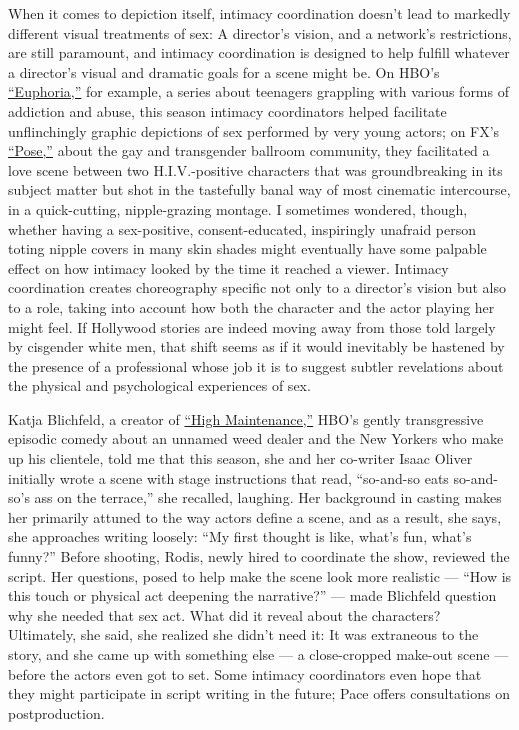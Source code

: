 When it comes to depiction itself, intimacy coordination doesn't lead to
markedly different visual treatments of sex: A director's vision, and a
network's restrictions, are still paramount, and intimacy coordination
is designed to help fulfill whatever a director's visual and dramatic
goals for a scene might be. On HBO's
\href{https://www.nytimes3xbfgragh.onion/2019/06/14/arts/television/euphoria-review-hbo.html}{``Euphoria,''}
for example, a series about teenagers grappling with various forms of
addiction and abuse, this season intimacy coordinators helped facilitate
unflinchingly graphic depictions of sex performed by very young actors;
on FX's
\href{https://www.nytimes3xbfgragh.onion/2018/06/01/arts/television/pose-review-fx-ryan-murphy.html}{``Pose,''}
about the gay and transgender ballroom community, they facilitated a
love scene between two H.I.V.-positive characters that was
groundbreaking in its subject matter but shot in the tastefully banal
way of most cinematic intercourse, in a quick-cutting, nipple-grazing
montage. I sometimes wondered, though, whether having a sex-positive,
consent-educated, inspiringly unafraid person toting nipple covers in
many skin shades might eventually have some palpable effect on how
intimacy looked by the time it reached a viewer. Intimacy coordination
creates choreography specific not only to a director's vision but also
to a role, taking into account how both the character and the actor
playing her might feel. If Hollywood stories are indeed moving away from
those told largely by cisgender white men, that shift seems as if it
would inevitably be hastened by the presence of a professional whose job
it is to suggest subtler revelations about the physical and
psychological experiences of sex.

Katja Blichfeld, a creator of
\href{https://www.nytimes3xbfgragh.onion/2016/09/16/arts/television/review-high-maintenance-hbo.html}{``High
Maintenance,''} HBO's gently transgressive episodic comedy about an
unnamed weed dealer and the New Yorkers who make up his clientele, told
me that this season, she and her co-writer Isaac Oliver initially wrote
a scene with stage instructions that read, ``so-and-so eats so-and-so's
ass on the terrace,'' she recalled, laughing. Her background in casting
makes her primarily attuned to the way actors define a scene, and as a
result, she says, she approaches writing loosely: ``My first thought is
like, what's fun, what's funny?'' Before shooting, Rodis, newly hired to
coordinate the show, reviewed the script. Her questions, posed to help
make the scene look more realistic --- ``How is this touch or physical
act deepening the narrative?'' --- made Blichfeld question why she
needed that sex act. What did it reveal about the characters?
Ultimately, she said, she realized she didn't need it: It was extraneous
to the story, and she came up with something else --- a close-cropped
make-out scene --- before the actors even got to set. Some intimacy
coordinators even hope that they might participate in script writing in
the future; Pace offers consultations on postproduction.


